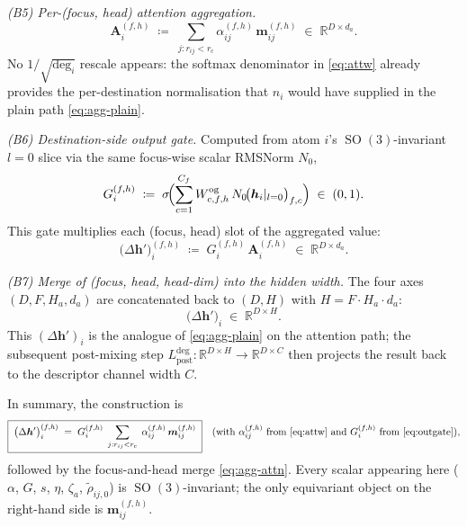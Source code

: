 \documentclass[11pt,a4paper]{article}
\DeclareMathOperator{\SO}{SO}
\newcommand{\R}{\mathbb{R}}
\newcommand{\bA}{\bm{A}}
\newcommand{\bh}{\bm{h}}
\newcommand{\rcut}{r_{\mathrm{c}}}
\theoremstyle{plain}
\theoremstyle{definition}
\theoremstyle{remark}
\begin{document}
\emph{(B5) Per-(focus, head) attention aggregation.}
\begin{equation}\label{eq:attagg}
    \bA_i^{(f,h)} \;\coloneqq\; \sum_{j:r_{ij}<\rcut}\alpha_{ij}^{(f,h)}\,\bm{m}_{ij}^{(f,h)} \;\in\;\R^{D\times d_a}.
\end{equation}
No $1/\sqrt{\deg_i}$ rescale appears: the softmax denominator in \eqref{eq:attw} already provides the per-destination normalisation that $n_i$ would have supplied in the plain path \eqref{eq:agg-plain}.

\emph{(B6) Destination-side output gate.}
Computed from atom $i$'s $\SO(3)$-invariant $l=0$ slice via the same focus-wise scalar RMSNorm $N_0$,
\begin{equation}\label{eq:outgate}
    G_i^{(f,h)}\;\coloneqq\;\sigma\!\Bigl(\sum_{c=1}^{C_f}W^{\mathrm{og}}_{c,f,h}\,N_0\!\bigl(\bh_i|_{l=0}\bigr)_{f,c}\Bigr)\;\in\;(0,1).
\end{equation}
This gate multiplies each (focus, head) slot of the aggregated value:
\begin{equation}\label{eq:gated-agg}
    \bigl(\Delta\bh'\bigr)_i^{(f,h)} \;\coloneqq\; G_i^{(f,h)}\,\bA_i^{(f,h)} \;\in\;\R^{D\times d_a}.
\end{equation}

\emph{(B7) Merge of (focus, head, head-dim) into the hidden width.}
The four axes $(D,F,H_a,d_a)$ are concatenated back to $(D,H)$ with $H=F\cdot H_a\cdot d_a$:
\begin{equation}\label{eq:agg-attn}
    \bigl(\Delta\bh'\bigr)_i \;\in\;\R^{D\times H}.
\end{equation}
This $(\Delta\bh')_i$ is the analogue of \eqref{eq:agg-plain} on the attention path; the subsequent post-mixing step $L^{\mathrm{deg}}_{\mathrm{post}}:\R^{D\times H}\to\R^{D\times C}$ then projects the result back to the descriptor channel width $C$.

In summary, the construction is
\[
    \boxed{\;
        \bigl(\Delta\bh'\bigr)_i^{(f,h)}\;=\;G_i^{(f,h)}\;\sum_{j:r_{ij}<\rcut}\;\alpha_{ij}^{(f,h)}\,\bm{m}_{ij}^{(f,h)}\;
    }\quad\text{(with $\alpha_{ij}^{(f,h)}$ from \eqref{eq:attw} and $G_i^{(f,h)}$ from \eqref{eq:outgate})},
\]
followed by the focus-and-head merge \eqref{eq:agg-attn}. Every scalar
appearing here ($\alpha$, $G$, $s$, $\eta$, $\zeta_a$, $\widetilde\rho_{ij,0}$)
is $\SO(3)$-invariant; the only equivariant object on the right-hand side is
$\bm{m}_{ij}^{(f,h)}$.
\end{document}
